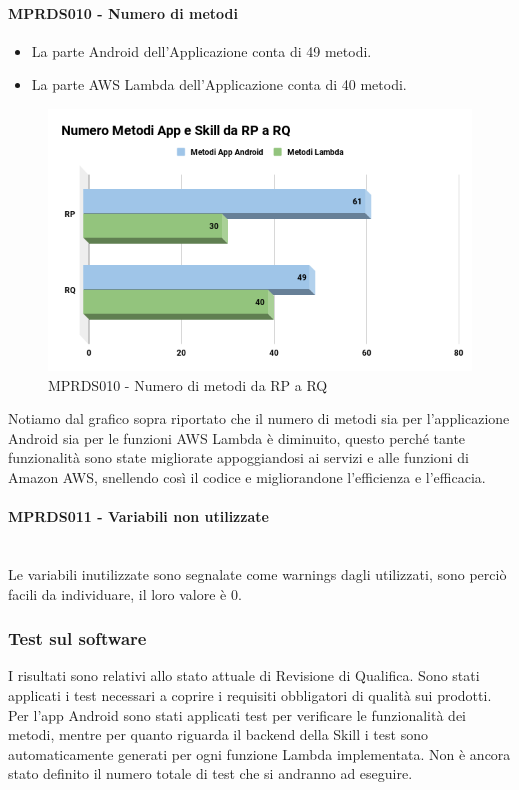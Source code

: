 \paragraph{MPRDS010 - Numero di metodi}
\begin{itemize}
	\item La parte Android dell'Applicazione conta di 49 metodi.
	\item La parte AWS Lambda dell'Applicazione conta di 40 metodi.
\end{itemize}
\begin{figure}[H]
	\centering
	\includegraphics[width=13cm,keepaspectratio]{../includes/pics/nMetodi.png}
	\caption{\label{fig:mission}MPRDS010 -  Numero di metodi da RP a RQ}
\end{figure}
Notiamo dal grafico sopra riportato che il numero di metodi sia per l'applicazione Android sia per le funzioni AWS Lambda è diminuito, questo perché tante funzionalità sono state migliorate appoggiandosi ai servizi e alle funzioni di Amazon AWS, snellendo così il codice e migliorandone l'efficienza e l'efficacia.
\paragraph{MPRDS011 - Variabili non utilizzate}\mbox{}\\[0.4cm]
Le variabili inutilizzate sono segnalate come warnings dagli  utilizzati, sono perciò facili da individuare, il loro valore è 0.
\subsubsection{Test sul software}
I risultati sono relativi allo stato attuale di Revisione di Qualifica. Sono stati applicati i test necessari a coprire i requisiti obbligatori di qualità sui prodotti. Per l'app Android sono stati applicati test per verificare le funzionalità dei metodi, mentre per quanto riguarda il backend della Skill i test sono automaticamente generati per ogni funzione Lambda implementata. Non è ancora stato definito il numero totale di test che si andranno ad eseguire.
